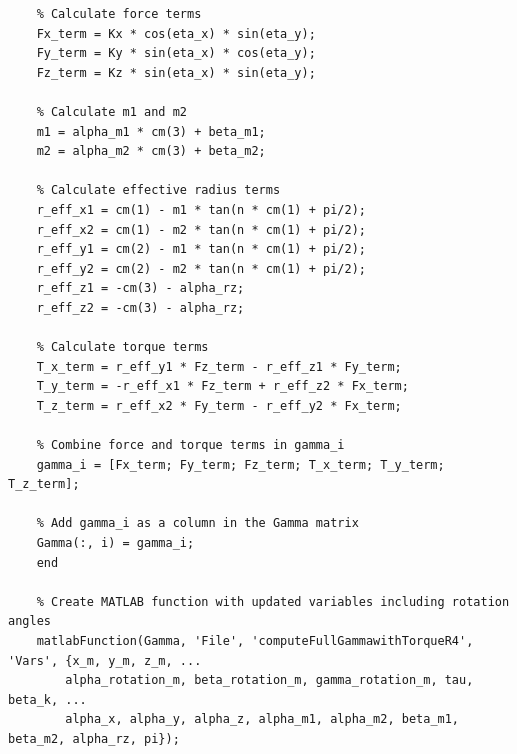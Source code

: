 \begin{latin}
\begin{verbatim}
	% Calculate force terms
	Fx_term = Kx * cos(eta_x) * sin(eta_y);
	Fy_term = Ky * sin(eta_x) * cos(eta_y);
	Fz_term = Kz * sin(eta_x) * sin(eta_y);
	
	% Calculate m1 and m2
	m1 = alpha_m1 * cm(3) + beta_m1;
	m2 = alpha_m2 * cm(3) + beta_m2;
	
	% Calculate effective radius terms
	r_eff_x1 = cm(1) - m1 * tan(n * cm(1) + pi/2);
	r_eff_x2 = cm(1) - m2 * tan(n * cm(1) + pi/2);
	r_eff_y1 = cm(2) - m1 * tan(n * cm(1) + pi/2);
	r_eff_y2 = cm(2) - m2 * tan(n * cm(1) + pi/2);
	r_eff_z1 = -cm(3) - alpha_rz;
	r_eff_z2 = -cm(3) - alpha_rz;
	
	% Calculate torque terms
	T_x_term = r_eff_y1 * Fz_term - r_eff_z1 * Fy_term;
	T_y_term = -r_eff_x1 * Fz_term + r_eff_z2 * Fx_term;
	T_z_term = r_eff_x2 * Fy_term - r_eff_y2 * Fx_term;
	
	% Combine force and torque terms in gamma_i
	gamma_i = [Fx_term; Fy_term; Fz_term; T_x_term; T_y_term; T_z_term];
	
	% Add gamma_i as a column in the Gamma matrix
	Gamma(:, i) = gamma_i;
	end
	
	% Create MATLAB function with updated variables including rotation angles
	matlabFunction(Gamma, 'File', 'computeFullGammawithTorqueR4', 'Vars', {x_m, y_m, z_m, ...
		alpha_rotation_m, beta_rotation_m, gamma_rotation_m, tau, beta_k, ...
		alpha_x, alpha_y, alpha_z, alpha_m1, alpha_m2, beta_m1, beta_m2, alpha_rz, pi});
	\end{verbatim}
\end{latin}

